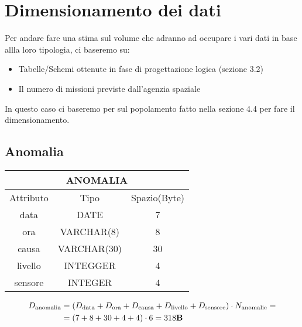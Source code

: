 \section{Dimensionamento dei dati}
Per andare fare una stima sul volume che adranno ad occupare i vari dati in base allla loro tipologia, ci baseremo su:
\begin{itemize}
\item Tabelle/Schemi ottenute in fase di progettazione logica (sezione 3.2)
\item Il numero di missioni previste dall'agenzia spaziale
\end{itemize}
In questo caso ci baseremo per sul popolamento fatto nella sezione 4.4 per fare il dimensionamento.
\subsection{Anomalia}
\begin{tabular}{|c|c|c|}
  \hline
  \multicolumn{3}{|c|}{\textbf{ANOMALIA}}\\
  \hline
  Attributo & Tipo & Spazio(Byte) \\
  \hline
  data & DATE & 7 \\
  ora & VARCHAR(8)  & 8 \\
  causa & VARCHAR(30) & 30 \\
  livello & INTEGGER & 4 \\
  sensore & INTEGER & 4 \\
  \hline
\end{tabular}
\begin{equation}
  \begin{aligned}
    D_{\text{anomalia}}&=(D_{\text{data}} + D_{\text{ora}} +D_{\text{causa}} +D_{\text{livello}} + D_{\text{sensore}}) \cdot N_{\text{anomalie}}=\\
    &=(7+8+30+4+4)\cdot 6 = 318\text{\textbf{B}}\\
  \end{aligned}
\end{equation}
